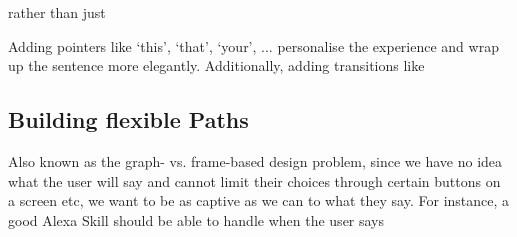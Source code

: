 
\begin{flushright}
\end{flushright}


\noindent rather than just 


\begin{flushright}
\end{flushright}



\noindent Adding pointers like `this', `that', `your', ... personalise the experience and wrap up the sentence more elegantly. Additionally, adding transitions like 
\begin{flushright}
\end{flushright}



\subsection*{Building flexible Paths}
Also known as the graph- vs. frame-based design problem, since we have no idea what the user will say and cannot limit their choices through certain buttons on a screen etc, we want to be as captive as we can to what they say. For instance, a good Alexa Skill should be able to handle when the user says

